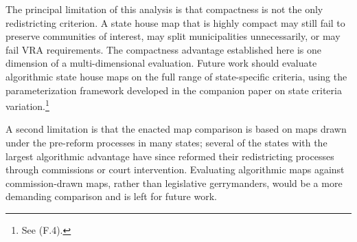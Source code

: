 The principal limitation of this analysis is that compactness is not the only redistricting criterion. A state house map that is highly compact may still fail to preserve communities of interest, may split municipalities unnecessarily, or may fail VRA requirements. The compactness advantage established here is one dimension of a multi-dimensional evaluation. Future work should evaluate algorithmic state house maps on the full range of state-specific criteria, using the parameterization framework developed in the companion paper on state criteria variation.\footnote{See \citet{dellaLibera2026legal} (F.4).}

A second limitation is that the enacted map comparison is based on maps drawn under the pre-reform processes in many states; several of the states with the largest algorithmic advantage have since reformed their redistricting processes through commissions or court intervention. Evaluating algorithmic maps against commission-drawn maps, rather than legislative gerrymanders, would be a more demanding comparison and is left for future work.
